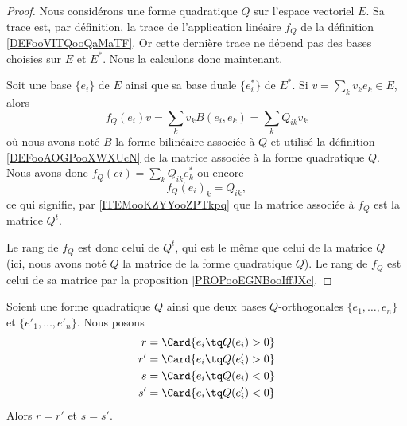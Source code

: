 \begin{proof}
	Nous considérons une forme quadratique \( Q\) sur l'espace vectoriel \( E\). Sa trace est, par définition, la trace de l'application linéaire \( f_Q\) de la définition \ref{DEFooVITQooQaMaTF}. Or cette dernière trace ne dépend pas des bases choisies sur \( E\) et \( E^*\). Nous la calculons donc maintenant.

	Soit une base \( \{ e_i \}\) de \( E\) ainsi que sa base duale \( \{ e_i^* \}\) de \( E^*\). Si \( v=\sum_kv_ke_k\in E\), alors
	\begin{equation}
		f_Q(e_i)v=\sum_kv_kB(e_i,e_k)=\sum_kQ_{ik}v_k
	\end{equation}
	où nous avons noté \( B\) la forme bilinéaire associée à \( Q\) et utilisé la définition \ref{DEFooAOGPooXWXUcN} de la matrice associée à la forme quadratique \( Q\). Nous avons donc \( f_Q(ei)=\sum_kQ_{ik}e_k^*\) ou encore
	\begin{equation}
		f_Q(e_i)_k=Q_{ik},
	\end{equation}
	ce qui signifie, par \ref{ITEMooKZYYooZPTkpq} que la matrice associée à \( f_Q\) est la matrice \( Q^t\).

	Le rang de \( f_Q\) est donc celui de \( Q^t\), qui est le même que celui de la matrice \( Q\) (ici, nous avons noté \( Q\) la matrice de la forme quadratique \( Q\)). Le rang de \( f_Q\) est celui de sa matrice par la proposition \ref{PROPooEGNBooIffJXc}.
\end{proof}


\begin{lemma}     \label{LEMooISHCooVDJEKo}
	Soient une forme quadratique \( Q\) ainsi que deux bases \( Q\)-orthogonales \( \{ e_1,\ldots, e_n \}\) et \( \{ e'_1,\ldots, e'_n \}\). Nous posons
	\begin{subequations}
		\begin{align}
			r  & =\Card\{ e_i\tq Q(e_i)>0 \}  \\
			r' & =\Card\{ e_i\tq Q(e'_i)>0 \} \\
			s  & =\Card\{ e_i\tq Q(e_i)<0 \}  \\
			s' & =\Card\{ e_i\tq Q(e'_i)<0 \}
		\end{align}
	\end{subequations}
	Alors \( r=r'\) et \( s=s'\).
\end{lemma}


